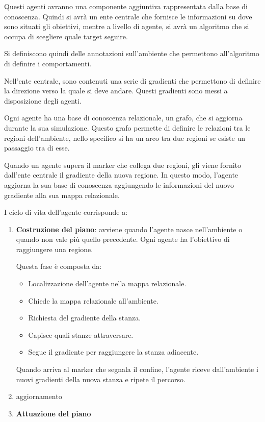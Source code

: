 Questi agenti avranno una componente aggiuntiva rappresentata dalla base di
conoscenza. Quindi si avrà un ente centrale che fornisce le informazioni su dove
sono situati gli obiettivi, mentre a livello di agente, si avrà un algoritmo che
si occupa di scegliere quale target seguire.

Si definiscono quindi delle annotazioni sull'ambiente che permettono all'algoritmo
di definire i comportamenti.

Nell'ente centrale, sono contenuti una serie di gradienti che permettono di
definire la direzione verso la quale si deve andare. Questi gradienti sono
messi a disposizione degli agenti.

Ogni agente ha una base di conoscenza relazionale, un grafo, che si aggiorna
durante la sua simulazione. Questo grafo permette di definire le relazioni tra
le regioni dell'ambiente, nello specifico si ha un arco tra due regioni se
esiste un passaggio tra di esse.

Quando un agente supera il marker che collega due regioni, gli viene fornito
dall'ente centrale il gradiente della nuova regione. In questo modo, l'agente
aggiorna la sua base di conoscenza aggiungendo le informazioni del nuovo gradiente
alla sua mappa relazionale.

I ciclo di vita dell'agente corrisponde a:
\begin{enumerate}
    \item \textbf{Costruzione del piano}: avviene quando l'agente nasce nell'ambiente
          o quando non vale più quello precedente. Ogni agente ha l'obiettivo di 
          raggiungere una regione. 
          
          Questa fase è composta da:
          \begin{itemize}
            \item Localizzazione dell'agente nella mappa relazionale.
            \item Chiede la mappa relazionale all'ambiente.
            \item Richiesta del gradiente della stanza.
            \item Capisce quali stanze attraversare.
            \item Segue il gradiente per raggiungere la stanza adiacente.
          \end{itemize}
          Quando arriva al marker che segnala il confine, l'agente riceve dall'ambiente
          i nuovi gradienti della nuova stanza e ripete il percorso.
    \item aggiornamento
    \item \textbf{Attuazione del piano}
\end{enumerate}

